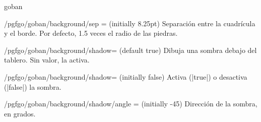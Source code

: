 \begin{environment}{{goban}}
\begin{key}{/pgfgo/goban/background/sep = (initially 8.25pt)}
		Separación entre la cuadrícula y el borde. Por defecto, 1.5 veces el radio de las piedras.
		
		\begin{codeexample}[]
			
			\begin{goban}[background = {sep = 0.625em}, name = a]
			\end{goban}
			
			\begin{goban}[background = {sep = 1.5em}, resume = a]
			\end{goban}
		\end{codeexample}
	\end{key}
	
	\begin{key}{/pgfgo/goban/background/shadow= (default true)}
		Dibuja una sombra debajo del tablero. Sin valor, la activa.
		\begin{codeexample}[]

			\begin{goban}[background = {shadow}, name = a]
			\end{goban}

			\begin{goban}[background = {shadow = {color = blue, opacity = 0.3}}, resume = a]
			\end{goban}
		\end{codeexample}
	\end{key}

	\begin{key}{/pgfgo/goban/background/shadow= (initially false)}
		Activa (|true|) o desactiva (|false|) la sombra.
	\end{key}

	\begin{key}{/pgfgo/goban/background/shadow/angle = (initially -45)}
		Dirección de la sombra, en grados.
		\begin{codeexample}[]

			\begin{goban}[background = {shadow}, name = a]
			\end{goban}

			\begin{goban}[background = {shadow = {angle = 45}}, resume = a]
			\end{goban}
		\end{codeexample}
	\end{key}


\end{environment}
